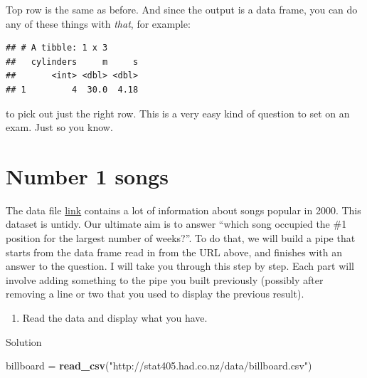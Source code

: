 \documentclass[]{tufte-book}
\newenvironment{Shaded}{}{}
\newcommand{\DataTypeTok}[1]{\textcolor[rgb]{0.56,0.13,0.00}{#1}}
\newcommand{\DecValTok}[1]{\textcolor[rgb]{0.25,0.63,0.44}{#1}}
\newcommand{\KeywordTok}[1]{\textcolor[rgb]{0.00,0.44,0.13}{\textbf{#1}}}
\newcommand{\NormalTok}[1]{#1}
\newcommand{\OperatorTok}[1]{\textcolor[rgb]{0.40,0.40,0.40}{#1}}
\newcommand{\StringTok}[1]{\textcolor[rgb]{0.25,0.44,0.63}{#1}}
\providecommand{\tightlist}{%
  \setlength{\itemsep}{0pt}\setlength{\parskip}{0pt}}
\theoremstyle{definition}
\theoremstyle{definition}
\theoremstyle{definition}
\theoremstyle{remark}
\begin{document}
Top row is the same as before. And since the output is a data frame, you
can do any of these things with \emph{that}, for example:

\begin{Shaded}
\end{Shaded}

\begin{verbatim}
## # A tibble: 1 x 3
##   cylinders     m     s
##       <int> <dbl> <dbl>
## 1         4  30.0  4.18
\end{verbatim}

to pick out just the right row. This is a very easy kind of question to
set on an exam. Just so you know.

\hypertarget{number-1-songs}{%
\section{Number 1 songs}\label{number-1-songs}}

The data file \href{http://stat405.had.co.nz/data/billboard.csv}{link}
contains a lot of information about songs popular in 2000. This dataset
is untidy. Our ultimate aim is to answer ``which song occupied the \#1
position for the largest number of weeks?''. To do that, we will build a
pipe that starts from the data frame read in from the URL above, and
finishes with an answer to the question. I will take you through this
step by step. Each part will involve adding something to the pipe you
built previously (possibly after removing a line or two that you used to
display the previous result).

\begin{enumerate}
\def\labelenumi{(\alph{enumi})}
\tightlist
\item
  Read the data and display what you have.
\end{enumerate}

Solution

\begin{Shaded}
\begin{Highlighting}[]
\NormalTok{billboard =}\StringTok{ }\KeywordTok{read_csv}\NormalTok{(}\StringTok{"http://stat405.had.co.nz/data/billboard.csv"}\NormalTok{)}
\end{Highlighting}
\end{Shaded}
\end{document}
